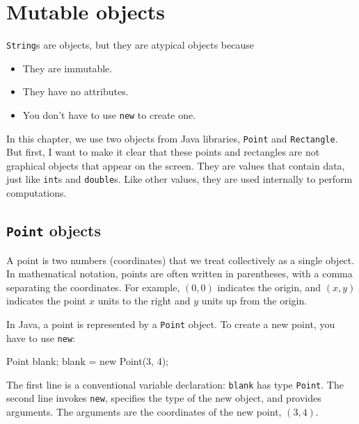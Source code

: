 \chapter{Mutable objects}
\label{chap08}
\label{objects}



{\tt String}s are objects, but they are atypical objects
because

\begin{itemize}

\item They are immutable.

\item They have no attributes.

\item You don't have to use {\tt new} to create one.

\end{itemize}

In this chapter, we use two objects from Java libraries,
 {\tt Point} and {\tt Rectangle}.
But first, I want to make it clear that these points
and rectangles are not graphical objects that appear on the
screen.  They are values that contain data, just like {\tt int}s
and {\tt double}s.  Like other values, they are used internally
to perform computations.


\section{{\tt Point} objects}

A point is two numbers (coordinates)
that we treat collectively as a single object.  In mathematical
notation, points are often written in parentheses, with a comma
separating the coordinates.  For example, $(0, 0)$ indicates
the origin, and $(x, y)$ indicates the point $x$ units to the
right and $y$ units up from the origin.


In Java, a point is represented by a {\tt Point} object.  To
create a new point, you have to use {\tt new}:

\begin{code}
    Point blank;
    blank = new Point(3, 4);
\end{code}
%
The first line is a conventional variable declaration: {\tt blank}
has type {\tt Point}.  The second line invokes {\tt new}, specifies
the type of the new object, and provides arguments.  The arguments are
the coordinates of the new point, $(3, 4)$.


